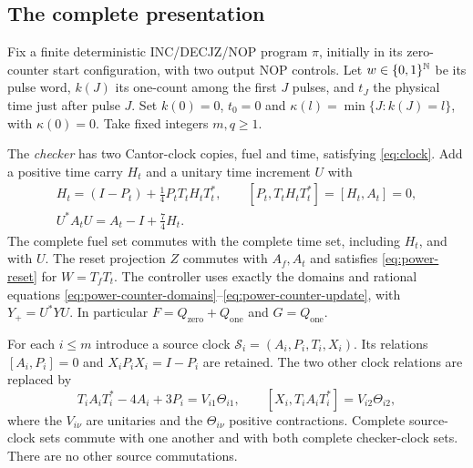 \subsection{The complete presentation}
Fix a finite deterministic INC/DECJZ/NOP program $\pi$, initially in its zero-counter start configuration, with two output NOP controls. Let $w\in\{0,1\}^{\mathbb N}$ be its pulse word, $k(J)$ its one-count among the first $J$ pulses, and $t_J$ the physical time just after pulse $J$. Set $k(0)=0$, $t_0=0$ and $\kappa(l)=\min\{J:k(J)=l\}$, with $\kappa(0)=0$. Take fixed integers $m,q\ge1$.

The \emph{checker} has two Cantor-clock copies, fuel and time, satisfying \eqref{eq:clock}. Add a positive time carry $H_t$ and a unitary time increment $U$ with
\begin{equation}\label{eq:profile-carry}
\begin{gathered}
 H_t=(I-P_t)+\tfrac14P_tT_tH_tT_t^*,\qquad
 [P_t,T_tH_tT_t^*]=[H_t,A_t]=0,\\
 U^*A_tU=A_t-I+\tfrac74H_t.
\end{gathered}
\end{equation}
The complete fuel set commutes with the complete time set, including $H_t$, and with $U$. The reset projection $Z$ commutes with $A_f,A_t$ and satisfies \eqref{eq:power-reset} for $W=T_fT_t$.
The controller uses exactly the domains and rational equations \eqref{eq:power-counter-domains}--\eqref{eq:power-counter-update}, with $Y_+=U^*YU$. In particular $F=Q_{\mathrm{zero}}+Q_{\mathrm{one}}$ and $G=Q_{\mathrm{one}}$.

For each $i\le m$ introduce a source clock $\mathcal S_i=(A_i,P_i,T_i,X_i)$. Its relations $[A_i,P_i]=0$ and $X_iP_iX_i=I-P_i$ are retained. The two other clock relations are replaced by
\begin{equation}\label{eq:profile-source}
 T_iA_iT_i^*-4A_i+3P_i=V_{i1}\Theta_{i1},\qquad
 [X_i,T_iA_iT_i^*]=V_{i2}\Theta_{i2},
\end{equation}
where the $V_{i\nu}$ are unitaries and the $\Theta_{i\nu}$ positive contractions. Complete source-clock sets commute with one another and with both complete checker-clock sets. There are no other source commutations.

